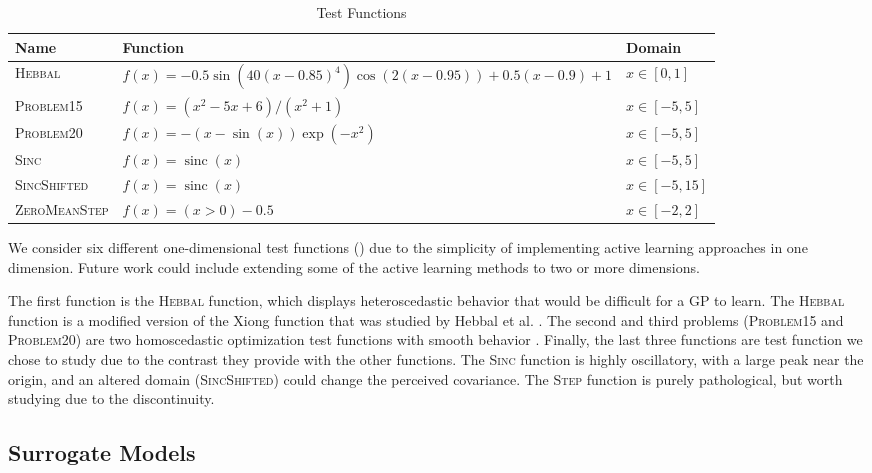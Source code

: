 \documentclass[conference]{IEEEtran}
\DeclareMathOperator{\sinc}{sinc}
\begin{document}
	\begin{table*}[htbp]
    \renewcommand{\arraystretch}{1.6}
    \centering
    \caption{Test Functions}
    \label{tab:test_fns}
        \begin{tabular}{lll}
        \toprule 
        \bfseries Name & \bfseries Function & \bfseries Domain \\ \midrule
	    \textsc{Hebbal} & $f(x) = -0.5 \sin\left(40 (x-0.85)^4\right) \cos(2(x-0.95)) + 0.5(x-0.9) + 1$ & $x \in [0, 1]$ \\
	    \textsc{Problem15} & $f(x) = (x^2 - 5x + 6) / (x^2 + 1) $ & $x \in [-5, 5]$ \\
	    \textsc{Problem20} & $f(x) = -(x - \sin(x))\exp(-x^2) $ & $x \in [-5, 5]$ \\
	    \textsc{Sinc} & $f(x) = \sinc(x) $ & $x \in [-5, 5]$ \\
	    \textsc{SincShifted} & $f(x) = \sinc(x) $ & $x \in [-5, 15]$ \\
	    \textsc{ZeroMeanStep} & $f(x) = (x > 0) - 0.5 $ & $x \in [-2, 2]$ \\
	    \bottomrule
	    \end{tabular}
	\end{table*}
	
	We consider six different one-dimensional test functions () due to the simplicity of implementing active learning approaches in one dimension. Future work could include extending some of the active learning methods to two or more dimensions.
	
	The first function is the \textsc{Hebbal} function, which displays heteroscedastic behavior that would be difficult for a GP to learn. The \textsc{Hebbal} function is a modified version of the Xiong function that was studied by Hebbal et al. \cite{hebbal2019bayesian}. The second and third problems (\textsc{Problem15} and \textsc{Problem20}) are two homoscedastic optimization test functions with smooth behavior \cite{1-DFunctions}. Finally, the last three functions are test function we chose to study due to the contrast they provide with the other functions. The \textsc{Sinc} function is highly oscillatory, with a large peak near the origin, and an altered domain (\textsc{SincShifted}) could change the perceived covariance. The \textsc{Step} function is purely pathological, but worth studying due to the discontinuity. 
	
	\subsection{Surrogate Models}
	
\end{document}
